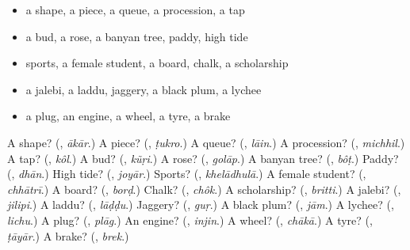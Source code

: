 \begin{itemize}
\raggedright
  \item a shape, a piece, a queue, a procession, a tap
  \item a bud, a rose, a banyan tree, paddy, high tide
  \item sports, a female student, a board, chalk, a scholarship
  \item a jalebi, a laddu, jaggery, a black plum, a lychee
  \item a plug, an engine, a wheel, a tyre, a brake
\end{itemize}

\begin{tcolorbox}[breakable,colback=teal!4,colframe=teal!35!black,title={Before you move on}]
A shape? (\textbf{}, \emph{ākār}.) A piece? (\textbf{}, \emph{ṭukro}.) A queue? (\textbf{}, \emph{lāin}.) A procession? (\textbf{}, \emph{michhil}.) A tap? (\textbf{}, \emph{kôl}.) A bud? (\textbf{}, \emph{kũṛi}.) A rose? (\textbf{}, \emph{golāp}.) A banyan tree? (\textbf{}, \emph{bôṭ}.) Paddy? (\textbf{}, \emph{dhān}.) High tide? (\textbf{}, \emph{joyār}.) Sports? (\textbf{}, \emph{khelādhulā}.) A female student? (\textbf{}, \emph{chhātrī}.) A board? (\textbf{}, \emph{borḍ}.) Chalk? (\textbf{}, \emph{chôk}.) A scholarship? (\textbf{}, \emph{britti}.) A jalebi? (\textbf{}, \emph{jilipi}.) A laddu? (\textbf{}, \emph{lāḍḍu}.) Jaggery? (\textbf{}, \emph{guṛ}.) A black plum? (\textbf{}, \emph{jām}.) A lychee? (\textbf{}, \emph{lichu}.) A plug? (\textbf{}, \emph{plāg}.) An engine? (\textbf{}, \emph{injin}.) A wheel? (\textbf{}, \emph{chākā}.) A tyre? (\textbf{}, \emph{ṭāyār}.) A brake? (\textbf{}, \emph{brek}.)
\end{tcolorbox}
